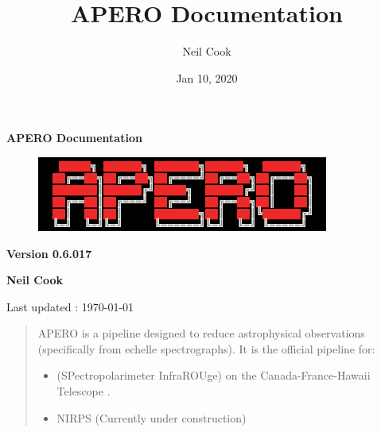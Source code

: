 \documentclass[a4paper,10pt,english]{report}
\title{APERO Documentation}
\date{Jan 10, 2020}
\author{Neil Cook}
\begin{document}
\pagestyle{empty}


        \begin{titlepage}
            \centering

            \vspace*{40mm} %
            \textbf{\Huge {APERO Documentation}}

            \vspace{5mm}
            \begin{figure}[!h]
                \centering
                \includegraphics[scale=1]{apero_logo.png}
            \end{figure}
            
            \vspace{5mm}
            \Large \textbf{Version 0.6.017}
            
            \vspace{5mm}
            \Large \textbf{{Neil Cook}}

            \vspace*{0mm}
            \small  Last updated : \MonthYearFormat\today


        \end{titlepage}

        \clearpage
        \tableofcontents

        
\pagestyle{plain}
 
\pagestyle{normal}
\label{\detokenize{index::doc}}

\begin{quote}

APERO is a pipeline designed to reduce astrophysical observations (specifically from echelle spectrographs).
It is the official pipeline for:
\begin{itemize}
\item {} 
 (SPectropolarimeter InfraROUge) on the Canada-France-Hawaii Telescope .

\item {} 
NIRPS (Currently under construction)

\end{itemize}
\end{quote}
\end{document}
